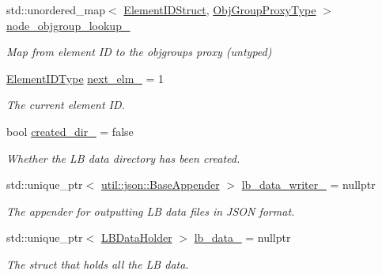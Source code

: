 \begin{DoxyCompactItemize}
std\+::unordered\+\_\+map$<$ \hyperlink{namespacevt_1_1vrt_1_1collection_1_1balance_a9f5b53fafb270212279a4757d2c4cd28}{Element\+I\+D\+Struct}, \hyperlink{namespacevt_ad7cae989df485fccca57f0792a880a8e}{Obj\+Group\+Proxy\+Type} $>$ \hyperlink{structvt_1_1vrt_1_1collection_1_1balance_1_1_node_l_b_data_a168baa5b6f532b6f37431ef4e7f7e48e}{node\+\_\+objgroup\+\_\+lookup\+\_\+}
\begin{DoxyCompactList}\small\item\em Map from element ID to the objgroup\textquotesingle{}s proxy (untyped) \end{DoxyCompactList}\item 
\hyperlink{namespacevt_1_1vrt_1_1collection_1_1balance_a592736f733df4f90856df90a1fd08905}{Element\+I\+D\+Type} \hyperlink{structvt_1_1vrt_1_1collection_1_1balance_1_1_node_l_b_data_a824c4e280138206d3fae1adb9c7f7e54}{next\+\_\+elm\+\_\+} = 1
\begin{DoxyCompactList}\small\item\em The current element ID. \end{DoxyCompactList}\item 
bool \hyperlink{structvt_1_1vrt_1_1collection_1_1balance_1_1_node_l_b_data_a9cccb7e2185485d798da41ca580460a9}{created\+\_\+dir\+\_\+} = false
\begin{DoxyCompactList}\small\item\em Whether the LB data directory has been created. \end{DoxyCompactList}\item 
std\+::unique\+\_\+ptr$<$ \hyperlink{structvt_1_1util_1_1json_1_1_base_appender}{util\+::json\+::\+Base\+Appender} $>$ \hyperlink{structvt_1_1vrt_1_1collection_1_1balance_1_1_node_l_b_data_a27ccfd9aa7b1cac52d508f7f42c38125}{lb\+\_\+data\+\_\+writer\+\_\+} = nullptr
\begin{DoxyCompactList}\small\item\em The appender for outputting LB data files in J\+S\+ON format. \end{DoxyCompactList}\item 
std\+::unique\+\_\+ptr$<$ \hyperlink{structvt_1_1vrt_1_1collection_1_1balance_1_1_l_b_data_holder}{L\+B\+Data\+Holder} $>$ \hyperlink{structvt_1_1vrt_1_1collection_1_1balance_1_1_node_l_b_data_aae1a8f7d4755acb52ece79124c6034c6}{lb\+\_\+data\+\_\+} = nullptr
\begin{DoxyCompactList}\small\item\em The struct that holds all the LB data. \end{DoxyCompactList}\end{DoxyCompactItemize}
